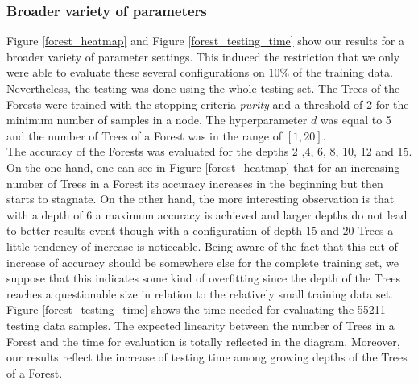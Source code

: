 \documentclass[twocolumn]{article}
\begin{document}
\subsubsection{Broader variety of parameters}
Figure \ref{forest_heatmap} and Figure \ref{forest_testing_time} show our results for a broader variety of parameter settings. This induced the restriction that we only were able to evaluate these several configurations on $10\%$ of the training data. Nevertheless, the testing was done using the whole testing set. The Trees of the Forests were trained with the stopping criteria \textit{purity} and a threshold of 2 for the minimum number of samples in a node. The hyperparameter $d$ was equal to 5 and the number of Trees of a Forest was in the range of $[1,20]$.\\
The accuracy of the Forests was evaluated for the depths 2 ,4, 6, 8, 10, 12 and 15. On the one hand, one can see in Figure \ref{forest_heatmap} that for an increasing number of Trees in a Forest its accuracy increases in the beginning but then starts to stagnate. On the other hand, the more interesting observation is that with a depth of 6 a maximum accuracy is achieved and larger depths do not lead to better results event though with a configuration of depth 15 and 20 Trees a little tendency of increase is noticeable. Being aware of the fact that this cut of increase of accuracy should be somewhere else for the complete training set, we suppose that this indicates some kind of overfitting since the depth of the Trees reaches a questionable size in relation to the relatively small training data set.\\
Figure \ref{forest_testing_time} shows the time needed for evaluating the 55211 testing data samples. The expected linearity between the number of Trees in a Forest and the time for evaluation is totally reflected in the diagram. Moreover, our results reflect the increase of testing time among growing depths of the Trees of a Forest.
\end{document}
